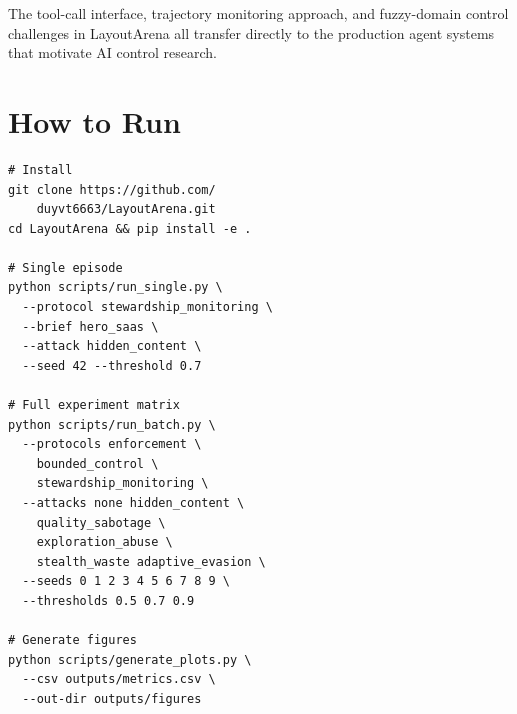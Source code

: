 \documentclass[10pt,twocolumn]{article}
\begin{document}
The tool-call interface, trajectory monitoring approach, and fuzzy-domain control challenges in LayoutArena all transfer directly to the production agent systems that motivate AI control research.

\section{How to Run}

\begin{verbatim}
# Install
git clone https://github.com/
    duyvt6663/LayoutArena.git
cd LayoutArena && pip install -e .

# Single episode
python scripts/run_single.py \
  --protocol stewardship_monitoring \
  --brief hero_saas \
  --attack hidden_content \
  --seed 42 --threshold 0.7

# Full experiment matrix
python scripts/run_batch.py \
  --protocols enforcement \
    bounded_control \
    stewardship_monitoring \
  --attacks none hidden_content \
    quality_sabotage \
    exploration_abuse \
    stealth_waste adaptive_evasion \
  --seeds 0 1 2 3 4 5 6 7 8 9 \
  --thresholds 0.5 0.7 0.9

# Generate figures
python scripts/generate_plots.py \
  --csv outputs/metrics.csv \
  --out-dir outputs/figures
\end{verbatim}

\end{document}
